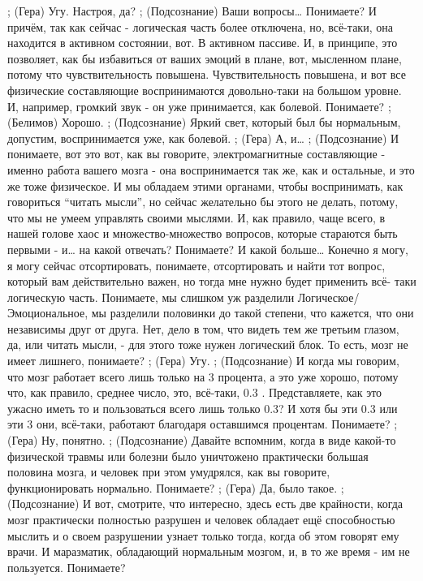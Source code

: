 ;	(Гера) Угу. Настроя, да?
;	(Подсознание) Ваши вопросы… Понимаете? И причём, так как сейчас - логическая часть более отключена, но, всё-таки, она находится в активном состоянии, вот. В активном пассиве. И, в принципе, это позволяет, как бы избавиться от ваших эмоций в плане, вот, мысленном плане, потому что чувствительность повышена. Чувствительность повышена, и вот все физические составляющие воспринимаются довольно-таки на большом уровне. И, например, громкий звук - он уже принимается, как болевой. Понимаете?
;	(Белимов) Хорошо. 
;	(Подсознание) Яркий свет, который был бы нормальным, допустим, воспринимается уже, как болевой.
;	(Гера) А, и…
;	(Подсознание) И понимаете, вот это вот, как вы говорите, электромагнитные составляющие  - именно работа вашего мозга - она воспринимается так же, как и остальные, и это же тоже физическое. И мы обладаем этими органами, чтобы воспринимать, как говориться ``читать мысли'', но сейчас желательно бы этого не делать, потому, что мы не умеем управлять своими мыслями. И, как правило, чаще всего, в нашей голове хаос и множество-множество вопросов, которые стараются быть первыми - и… на какой отвечать? Понимаете? И какой больше… Конечно я могу, я могу сейчас отсортировать, понимаете, отсортировать и найти тот вопрос, который вам действительно важен, но тогда мне нужно будет применить всё- таки логическую часть. Понимаете, мы слишком уж разделили Логическое/Эмоциональное, мы разделили половинки до такой степени, что кажется, что они независимы друг от друга. Нет, дело в том, что видеть тем же третьим глазом, да, или читать мысли, -  для этого тоже нужен логический блок. То есть, мозг не имеет лишнего, понимаете?
;	(Гера) Угу.
;	(Подсознание) И когда мы говорим, что мозг работает всего лишь только на 3 процента, а это уже хорошо, потому что, как правило, среднее число, это, всё-таки, 0.3 . Представляете, как это ужасно иметь то и пользоваться всего лишь только 0.3? И хотя бы эти 0.3 или эти 3 они, всё-таки, работают благодаря оставшимся процентам. Понимаете?
;	(Гера) Ну, понятно.
;	(Подсознание) Давайте вспомним, когда в виде какой-то физической травмы или болезни было уничтожено практически большая половина мозга, и человек при этом умудрялся, как вы говорите, функционировать нормально. Понимаете?
;	(Гера) Да, было такое.
;	(Подсознание) И вот, смотрите, что интересно, здесь есть две крайности, когда мозг практически полностью разрушен и человек обладает ещё способностью мыслить и о своем разрушении узнает только тогда, когда  об этом говорят ему врачи. И маразматик, обладающий нормальным мозгом, и, в то же время - им не пользуется. Понимаете?
